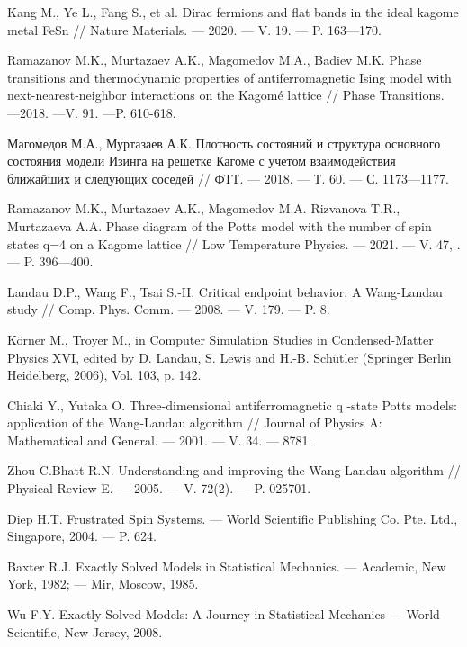 \begin{thebibliography}{111}
  Kang M., Ye L., Fang S., et al.
  Dirac fermions and flat bands in the ideal kagome metal FeSn
  //
  Nature Materials.
  --- 2020.
  --- V. 19.
  --- P. 163---170.

  Ramazanov M.K., Murtazaev A.K., Magomedov M.A., Badiev M.K.
  Phase transitions and thermodynamic properties of antiferromagnetic Ising model with next-nearest-neighbor interactions on the Kagomé lattice
  //
  Phase Transitions. ---2018. ---V. 91. ---P. 610-618.

  Магомедов М.А., Муртазаев А.К.
  Плотность состояний и структура основного состояния модели Изинга на решетке Кагоме с учетом взаимодействия ближайших и следующих соседей
  //
  ФТТ.
  --- 2018.
  --- Т. 60.
  --- С. 1173---1177.

  Ramazanov M.K., Murtazaev A.K., Magomedov M.A. Rizvanova T.R., Murtazaeva A.A.
  Phase diagram of the Potts model with the number of spin states q=4 on a Kagome lattice
  //
  Low Temperature Physics.
  --- 2021.
  --- V. 47, .
  --- P. 396---400.

  Landau D.P., Wang F., Tsai S.-H.
  Critical endpoint behavior: A Wang-Landau study
  //
  Comp. Phys. Comm.
  --- 2008.
  --- V. 179.
  --- P. 8.

  Körner M., Troyer M., in Computer Simulation Studies in Condensed-Matter Physics XVI, edited by D. Landau, S. Lewis and H.-B. Schütler (Springer Berlin Heidelberg, 2006), Vol. 103, p. 142.

  Chiaki Y., Yutaka O.
  Three-dimensional antiferromagnetic q -state Potts models: application of the Wang-Landau algorithm
  //
  Journal of Physics A: Mathematical and General.
  --- 2001.
  --- V. 34.
  --- 8781.

  Zhou C.Bhatt R.N.
  Understanding and improving the Wang-Landau algorithm
  //
  Physical Review E.
  --- 2005.
  --- V. 72(2).
  --- P. 025701.



  Diep H.T.
  Frustrated Spin Systems.
  --- World Scientific Publishing Co. Pte. Ltd., Singapore, 2004.
  --- P. 624.

  Baxter R.J.
  Exactly Solved Models in Statistical Mechanics.
  --- Academic, New York, 1982;
  --- Mir, Moscow, 1985.

  Wu F.Y.
  Exactly Solved Models: A Journey in Statistical Mechanics
  --- World Scientific, New Jersey, 2008.


\end{thebibliography}
